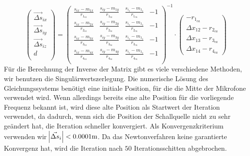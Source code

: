 $$
\begin{pmatrix}
\vec{\Delta{s}}_{ix} \\
\vec{\Delta{s}}_{iy} \\
\vec{\Delta{s}}_{iz} \\
                d \\
\end{pmatrix}
=
{\begin{pmatrix}
\frac{s_{ix} - m_{1x}}{r_{1_{ca}}} & \frac{s_{iy} - m_{1y}}{r_{1_{ca}}} & \frac{s_{i_z} - m_{1_z}}{r_{1_{ca}}} & -1 \\
\frac{s_{ix} - m_{2x}}{r_{2_{ca}}} & \frac{s_{iy} - m_{2y}}{r_{2_{ca}}} & \frac{s_{i_z} - m_{1_z}}{r_{2_{ca}}} & -1 \\
\frac{s_{ix} - m_{3x}}{r_{3_{ca}}} & \frac{s_{iy} - m_{3y}}{r_{3_{ca}}} & \frac{s_{i_z} - m_{1_z}}{r_{3_{ca}}} & -1 \\
\frac{s_{ix} - m_{4x}}{r_{4_{ca}}} & \frac{s_{iy} - m_{4y}}{r_{4_{ca}}} & \frac{s_{i_z} - m_{1_z}}{r_{4_{ca}}} & -1 \\
\end{pmatrix}}^{-1}
\cdot
\begin{pmatrix}
-r_{1_{ca}}\\

\Delta{x_{12}} - r_{2_{ca}}\\
\Delta{x_{13}} - r_{3_{ca}}\\
\Delta{x_{14}} - r_{4_{ca}}
\end{pmatrix}
$$
\fi
Für die Berechnung der Inverse der Matrix gibt es viele verschiedene Methoden, wir benutzen die Singulärwertszerlegung. Die numerische Lösung des Gleichungssystems benötigt eine initiale Position, für die die Mitte der Mikrofone verwendet wird. Wenn allerdings bereits eine alte Position für die vorliegende Frequenz bekannt ist, wird diese alte Position als Startwert der Iteration verwendet, da dadurch, wenn sich die Position der Schallquelle nicht zu sehr geändert hat, die Iteration schneller konvergiert. Als Konvergenzkriterium verwenden wir $\abs{\vec{\Delta{s}}_i} < 0.0001\mathrm{m}$. Da das Newtonverfahren keine garantierte Konvergenz hat, wird die Iteration nach $50$ Iterationsschitten abgebrochen.

